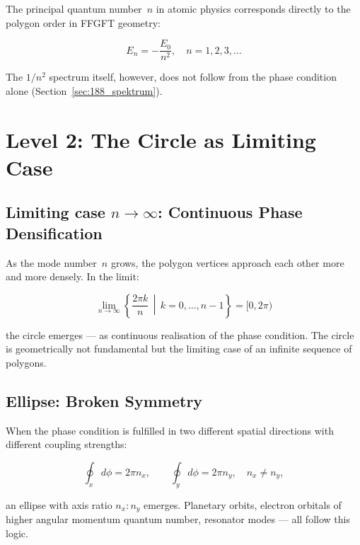 The principal quantum number~$n$ in atomic physics corresponds directly
to the polygon order in FFGFT geometry:

\begin{equation}
  E_n = -\frac{E_0}{n^2}, \quad n = 1, 2, 3, \ldots
\end{equation}

The $1/n^2$ spectrum itself, however, does not follow from the phase
condition alone (Section~\ref{sec:188_spektrum}).

\section{Level 2: The Circle as Limiting Case}

\subsection{Limiting case \texorpdfstring{$n \to \infty$}{n to infinity}: Continuous Phase Densification}

As the mode number~$n$ grows, the polygon vertices approach each
other more and more densely. In the limit:

\begin{equation}
  \lim_{n \to \infty} \left\{ \frac{2\pi k}{n} \,\middle|\,
  k = 0,\ldots,n-1 \right\} = [0, 2\pi)
\end{equation}

the circle emerges — as continuous realisation of the phase condition.
The circle is geometrically not fundamental but the limiting case of
an infinite sequence of polygons.

\subsection{Ellipse: Broken Symmetry}

When the phase condition is fulfilled in two different spatial
directions with different coupling strengths:

\begin{equation}
  \oint_x d\phi = 2\pi n_x, \qquad
  \oint_y d\phi = 2\pi n_y, \quad n_x \neq n_y,
\end{equation}

an ellipse with axis ratio $n_x : n_y$ emerges. Planetary orbits,
electron orbitals of higher angular momentum quantum number,
resonator modes — all follow this logic.


